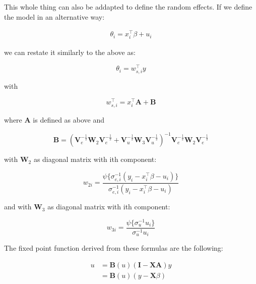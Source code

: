 This whole thing can also be addapted to define the random effects. If
we define the model in an alternative way:

\begin{align}
\theta_i = x_i^\top \beta + u_i
\end{align}

we can restate it similarly to the above as:

\[
\theta_i = w_{s, i}^\top y
\]

with

\[
w_{s, i}^\top = x_i^\top \mathbf{A} + \mathbf{B}
\]

where $\mathbf{A}$ is defined as above and

\[
\mathbf{B} = 
\left(
  \mathbf{V}_e^{-\frac{1}{2}} \mathbf{W}_2 \mathbf{V}_e^{-\frac{1}{2}} +
  \mathbf{V}_u^{-\frac{1}{2}} \mathbf{W}_3 \mathbf{V}_u^{-\frac{1}{2}}
\right)^{-1} 
\mathbf{V}_e^{-\frac{1}{2}} \mathbf{W}_2 \mathbf{V}_e^{-\frac{1}{2}}
\]

with $\mathbf{W}_2$ as diagonal matrix with ith component:

\[
w_{2i} = 
\frac{
  \psi\{\sigma^{-1}_{e, i} (y_i - x_i^\top \beta - u_i)\}
}{
  \sigma^{-1}_{e, i} (y_i - x_i^\top \beta - u_i)
}
\]

and with $\mathbf{W}_3$ as diagonal matrix with ith component:

\[
w_{3i} = \frac{
  \psi\{\sigma_u^{-1} u_i\}
}{
  \sigma_u^{-1} u_i
}
\]

The fixed point function derived from these formulas are the following:

\begin{align*}
u &= \mathbf{B}(u)\left(\mathbf{I} - \mathbf{X}\mathbf{A}\right)y \\
  &= \mathbf{B}(u)\left(y - \mathbf{X}\beta\right)
\end{align*}

